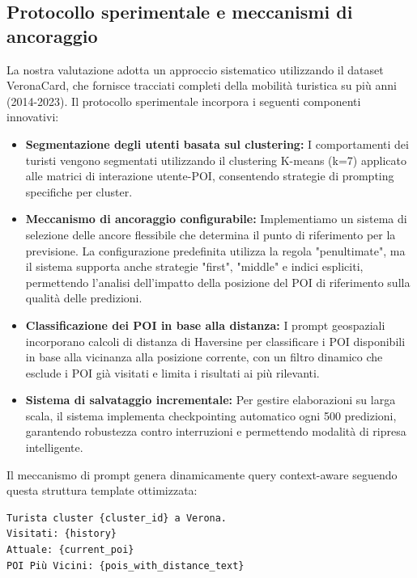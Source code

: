\begin{itemize}
\section{Protocollo sperimentale e meccanismi di ancoraggio}

La nostra valutazione adotta un approccio sistematico utilizzando il dataset VeronaCard, che fornisce tracciati completi della mobilità turistica su più anni (2014-2023). Il protocollo sperimentale incorpora i seguenti componenti innovativi:

\begin{itemize}
\item \textbf{Segmentazione degli utenti basata sul clustering:} I comportamenti dei turisti vengono segmentati utilizzando il clustering K-means (k=7) applicato alle matrici di interazione utente-POI, consentendo strategie di prompting specifiche per cluster.

\item \textbf{Meccanismo di ancoraggio configurabile:} Implementiamo un sistema di selezione delle ancore flessibile che determina il punto di riferimento per la previsione. La configurazione predefinita utilizza la regola "penultimate", ma il sistema supporta anche strategie "first", "middle" e indici espliciti, permettendo l'analisi dell'impatto della posizione del POI di riferimento sulla qualità delle predizioni.

\item \textbf{Classificazione dei POI in base alla distanza:} I prompt geospaziali incorporano calcoli di distanza di Haversine per classificare i POI disponibili in base alla vicinanza alla posizione corrente, con un filtro dinamico che esclude i POI già visitati e limita i risultati ai più rilevanti.

\item \textbf{Sistema di salvataggio incrementale:} Per gestire elaborazioni su larga scala, il sistema implementa checkpointing automatico ogni 500 predizioni, garantendo robustezza contro interruzioni e permettendo modalità di ripresa intelligente.
\end{itemize}

Il meccanismo di prompt genera dinamicamente query context-aware seguendo questa struttura template ottimizzata:

\begin{lstlisting}[language=text, caption=Template di Prompt Comprensivo]
Turista cluster {cluster_id} a Verona.
Visitati: {history}
Attuale: {current_poi}
POI Più Vicini: {pois_with_distance_text}


\end{lstlisting}
\end{itemize}
